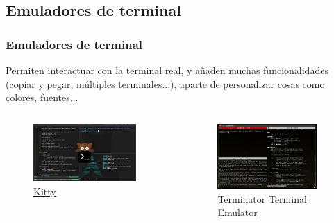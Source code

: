 \documentclass[aspectratio=43]{beamer}
\begin{document}
\subsection{Emuladores de terminal}
\begin{frame}
    \frametitle{Emuladores de terminal}
    Permiten interactuar con la terminal real, y añaden muchas funcionalidades (copiar y pegar, múltiples terminales...), aparte de personalizar cosas como colores, fuentes...\newline
    
    \begin{columns}[c]
        \begin{column}{0.5\textwidth}
            \begin{figure}
                \centering
                \includegraphics[width=0.9\textwidth]{img/kitty_terminal.jpg}
                \caption{\href{https://sw.kovidgoyal.net/kitty/}{Kitty}}
            \end{figure}
        \end{column}
        \begin{column}{0.5\textwidth}
            \begin{figure}
                \centering
                \includegraphics[width=0.9\textwidth]{img/terminator_terminal.jpg}
                \caption{\href{https://gnome-terminator.org/}{Terminator Terminal Emulator}}
            \end{figure}
        \end{column}
    \end{columns}

\end{frame}
\end{document}
